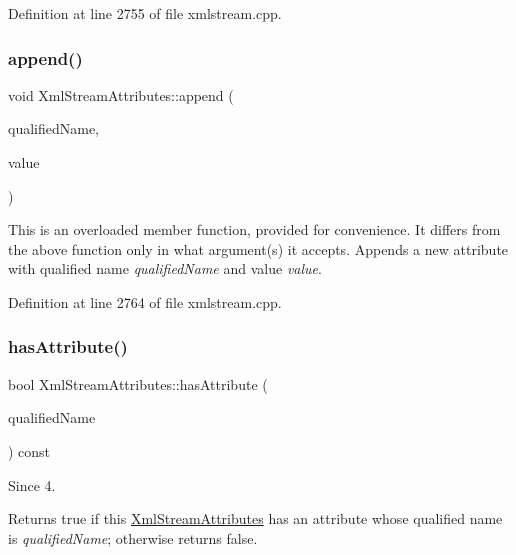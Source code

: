Definition at line 2755 of file xmlstream.\+cpp.

\mbox{\label{class_xml_stream_attributes_a062ae122b7c39f5993cfcf0cd30a4942}} 
\subsubsection{\texorpdfstring{append()}{append()}\hspace{0.1cm}{\footnotesize\ttfamily [2/2]}}
{\footnotesize\ttfamily void Xml\+Stream\+Attributes\+::append (\begin{DoxyParamCaption}\item[{const Q\+String \&}]{qualified\+Name,  }\item[{const Q\+String \&}]{value }\end{DoxyParamCaption})}

This is an overloaded member function, provided for convenience. It differs from the above function only in what argument(s) it accepts. Appends a new attribute with qualified name {\itshape qualified\+Name} and value {\itshape value}. 

Definition at line 2764 of file xmlstream.\+cpp.

\mbox{\label{class_xml_stream_attributes_a19c0aee6f2a399a8b830441260d46b84}} 
\subsubsection{\texorpdfstring{has\+Attribute()}{hasAttribute()}\hspace{0.1cm}{\footnotesize\ttfamily [1/3]}}
{\footnotesize\ttfamily bool Xml\+Stream\+Attributes\+::has\+Attribute (\begin{DoxyParamCaption}\item[{const Q\+String \&}]{qualified\+Name }\end{DoxyParamCaption}) const\hspace{0.3cm}{\ttfamily [inline]}}

\begin{DoxySince}{Since}
4.
\end{DoxySince}
Returns {\ttfamily true} if this \hyperlink{class_xml_stream_attributes}{Xml\+Stream\+Attributes} has an attribute whose qualified name is {\itshape qualified\+Name}; otherwise returns {\ttfamily false}.

